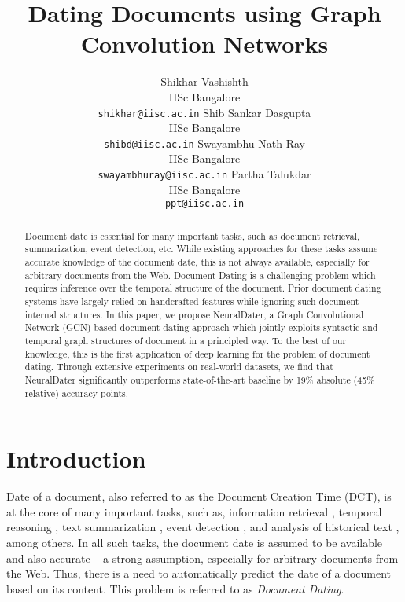 \documentclass[11pt,a4paper]{article}
\title{Dating Documents using Graph Convolution Networks}
\author{Shikhar Vashishth \\
 	IISc Bangalore \\
 	{\small {\tt shikhar@iisc.ac.in}} \And
 	Shib Sankar Dasgupta \\
 	IISc Bangalore \\
 	{\small {\tt shibd@iisc.ac.in}} \And
 	Swayambhu Nath Ray \\
 	IISc Bangalore \\
 	{\small {\tt swayambhuray@iisc.ac.in}} \And
 	Partha Talukdar \\
 	IISc Bangalore \\
 	{\small {\tt ppt@iisc.ac.in}}
 }
\date{}
\newcommand{\method}{NeuralDater}
\begin{document}
\maketitle
\begin{abstract}
	Document date is essential for many important tasks, such as document retrieval, summarization, event detection, etc. While existing approaches for these tasks assume accurate knowledge of the document date, this is not always available, especially for arbitrary documents from the Web. Document Dating is a challenging problem which requires inference over the temporal structure of the document. Prior document dating systems have largely relied on handcrafted features while ignoring such document-internal structures. In this paper, we propose \method{}, a Graph Convolutional Network (GCN) based document dating approach which jointly exploits syntactic and temporal graph structures of document in a principled way. To the best of our knowledge, this is the first application of deep learning for the problem of document dating. Through extensive experiments on real-world datasets, we find that \method{} significantly outperforms state-of-the-art baseline by 19\% absolute (45\% relative) accuracy points.
\end{abstract}


\section{Introduction}
\label{sec:introduction}

Date of a document, also referred to as the Document Creation Time (DCT), is at the core of many important tasks, such as, information retrieval \cite{ir_time_usenix,ir_time_li,ir_time_dakka}, temporal reasoning \cite{temp_reasoner1,temp_reasoner2}, text summarization \cite{text_summ_time}, event detection \cite{event_detection}, and analysis of historical text \cite{history_time}, among others. In all such tasks, the document date is assumed to be available and also accurate -- a strong assumption, especially for arbitrary documents from the Web. Thus, there is a need to automatically predict the date of a document based on its content. This problem is referred to as \emph{Document Dating}.
\end{document}
